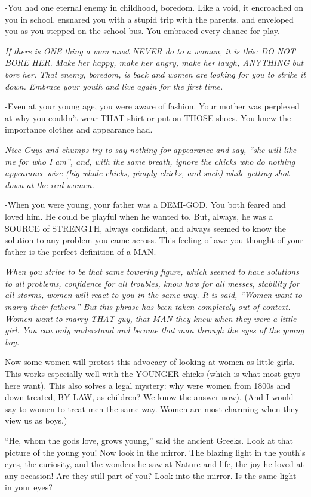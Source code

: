 			-You had one eternal enemy in childhood, boredom. Like a void, it encroached on you in school, ensnared you with a stupid trip with the parents, and enveloped you as you stepped on the school bus. You embraced every chance for play.

			\textit{If there is ONE thing a man must NEVER do to a woman, it is this: DO NOT BORE HER. Make her happy, make her angry, make her laugh, ANYTHING but bore her. That enemy, boredom, is back and women are looking for you to strike it down. Embrace your youth and live again for the first time.}
			
			-Even at your young age, you were aware of fashion. Your mother was perplexed at why you couldn't wear THAT shirt or put on THOSE shoes. You knew the importance clothes and appearance had.

			\textit{Nice Guys and chumps try to say nothing for appearance and say, ``she will like me for who I am'', and, with the same breath, ignore the chicks who do nothing appearance wise (big whale chicks, pimply chicks, and such) while getting shot down at the real women.}

			-When you were young, your father was a DEMI-GOD. You both feared and loved him. He could be playful when he wanted to. But, always, he was a SOURCE of STRENGTH, always confidant, and always seemed to know the solution to any problem you came across. This feeling of awe you thought of your father is the perfect definition of a MAN.

			\textit{When you strive to be that same towering figure, which seemed to have solutions to all problems, confidence for all troubles, know how for all messes, stability for all storms, women will react to you in the same way. It is said, ``Women want to marry their fathers.'' But this phrase has been taken completely out of context. Women want to marry THAT guy, that MAN they knew when they were a little girl. You can only understand and become that man through the eyes of the young boy.}
			
			Now some women will protest this advocacy of looking at women as little girls. This works especially well with the YOUNGER chicks (which is what most guys here want). This also solves a legal mystery: why were women from 1800s and down treated, BY LAW, as children? We know the answer now). (And I would say to women to treat men the same way. Women are most charming when they view us as boys.)

			``He, whom the gods love, grows young,'' said the ancient Greeks. Look at that picture of the young you! Now look in the mirror. The blazing light in the youth's eyes, the curiosity, and the wonders he saw at Nature and life, the joy he loved at any occasion! Are they still part of you? Look into the mirror. Is the same light in your eyes?

